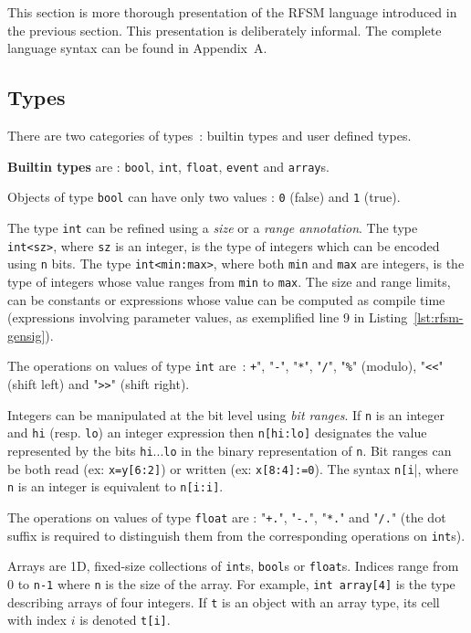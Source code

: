This section is more thorough presentation of the RFSM language introduced in the previous
section. This presentation is deliberately informal. The complete language syntax can
be found in Appendix~A.

\subsection{Types}
\label{sec:types}

There are two categories of types~: builtin types and user defined types.

\medskip
\textbf{Builtin types} are : \texttt{bool}, \texttt{int}, \texttt{float}, \texttt{event} and
\texttt{array}s.

\step Objects of type \texttt{bool} can have only two values : \texttt{0} (false) and \texttt{1} (true).

\step The type \texttt{int} can be refined using a \emph{size} or a \emph{range annotation}. The
type \verb|int<sz>|, where \verb|sz| is an integer, is the type of integers which can be encoded using
\verb|n| bits. The type \verb|int<min:max>|, where both \verb|min| and \verb|max| are integers, is
the type of integers whose value ranges from \verb|min| to \verb|max|. The size and range limits,
can be constants or expressions whose value can be computed as compile time
(expressions involving parameter values, as exemplified line 9 in Listing~\ref{lst:rfsm-gensig}).

\step The operations on values of type \texttt{int} are~:
\verb|+|", "\verb|-|", "\verb|*|", "\verb|/|", "\verb|%|" (modulo), "\verb|<<|" (shift left) and
"\verb|>>|" (shift right).

\step Integers can be manipulated at the bit level using \emph{bit ranges}. If \verb|n| is an
integer and \verb|hi| (resp. \verb|lo|) an integer expression then \verb|n[hi:lo]| designates the
value represented by the bits \verb|hi|...\verb|lo| in the binary representation of \verb|n|. Bit
ranges can be both read (ex: \verb|x=y[6:2]|) or written (ex: \verb|x[8:4]:=0|). The syntax
\verb|n[i||, where \verb|n| is an integer is equivalent to \verb|n[i:i]|.

\step The operations on values of type \texttt{float} are : "\verb|+.|", "\verb|-.|", "\verb|*.|" and
"\verb|/.|" (the dot suffix is required to distinguish them from the corresponding operations on
\texttt{int}s).

\step Arrays are 1D, fixed-size collections of \verb|int|s, \verb|bool|s or \verb|float|s. Indices
range from 0 to \verb|n-1| where \verb|n| is the size of the array. For example,
 \verb|int array[4]| is the type describing arrays of four integers. If \verb|t| is an object
  with an array type, its cell with index $i$ is denoted \verb|t[i]|.


